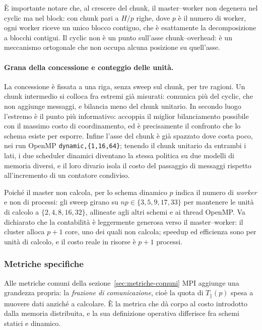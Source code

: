 È importante notare che, al crescere del chunk, il master--worker non degenera
nel cyclic ma nel block: con chunk pari a $H/p$ righe, dove $p$ è il numero di
worker, ogni worker riceve un unico
blocco contiguo, che è esattamente la decomposizione a blocchi contigui. Il
cyclic non è un punto sull'asse chunk--overhead: è un meccanismo ortogonale che
non occupa alcuna posizione su quell'asse.

\paragraph{Grana della concessione e conteggio delle unità.}
La concessione è fissata a una riga, senza sweep sul chunk, per tre ragioni.
Un chunk intermedio si colloca fra estremi già misurati: comunica più del
cyclic, che non aggiunge messaggi, e bilancia meno del chunk unitario. In secondo luogo l'estremo è il
punto più informativo: accoppia il miglior bilanciamento possibile con il massimo
costo di coordinamento, ed è precisamente il confronto che lo schema esiste per
esporre. Infine l'asse del chunk è già spazzato dove costa poco, nei run OpenMP
\texttt{dynamic,\{1,16,64\}}; tenendo il chunk unitario da entrambi i lati, i
due scheduler dinamici diventano la stessa politica su due modelli di memoria
diversi, e il loro divario isola il costo del passaggio di messaggi rispetto
all'incremento di un contatore condiviso.

Poiché il master non calcola, per lo schema dinamico $p$ indica il numero di
\emph{worker} e non di processi: gli sweep girano su $np \in \{3, 5, 9, 17,
33\}$ per mantenere le unità di calcolo a $\{2, 4, 8, 16, 32\}$, allineate agli
altri schemi e ai thread OpenMP. Va dichiarato che la contabilità è leggermente
generosa verso il master--worker: il cluster alloca $p+1$ core, uno dei quali
non calcola; speedup ed efficienza sono per unità di calcolo, e il costo reale
in risorse è $p+1$ processi.

\subsubsection{Metriche specifiche}
\label{sec:mpi-metriche}

Alle metriche comuni della sezione~\ref{sec:metriche-comuni} MPI aggiunge una
grandezza propria: la \emph{frazione di comunicazione}, cioè la quota di $T_\parallel(p)$
spesa a muovere dati anziché a calcolare. È la metrica che dà corpo al costo
introdotto dalla memoria distribuita, e la sua definizione operativa differisce
fra schemi statici e dinamico.

